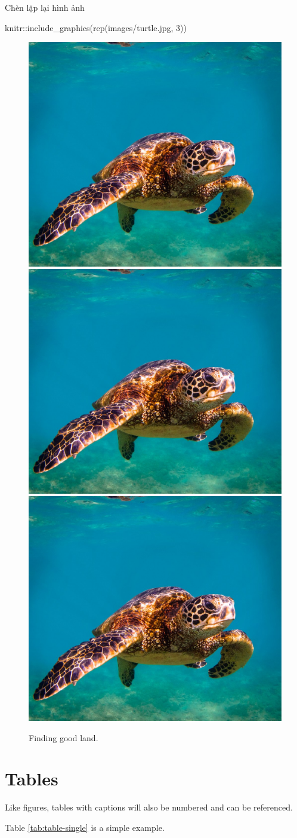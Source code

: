 \documentclass[
]{book}
\newenvironment{Shaded}{\begin{snugshade}}{\end{snugshade}}
\newcommand{\DecValTok}[1]{\textcolor[rgb]{0.00,0.00,0.81}{#1}}
\newcommand{\FunctionTok}[1]{\textcolor[rgb]{0.00,0.00,0.00}{#1}}
\newcommand{\NormalTok}[1]{#1}
\newcommand{\SpecialCharTok}[1]{\textcolor[rgb]{0.00,0.00,0.00}{#1}}
\newcommand{\StringTok}[1]{\textcolor[rgb]{0.31,0.60,0.02}{#1}}
\theoremstyle{definition}
\theoremstyle{definition}
\theoremstyle{definition}
\theoremstyle{definition}
\theoremstyle{remark}
\begin{document}
Chèn lặp lại hình ảnh

\begin{Shaded}
\begin{Highlighting}[]
\NormalTok{knitr}\SpecialCharTok{::}\FunctionTok{include\_graphics}\NormalTok{(}\FunctionTok{rep}\NormalTok{(}\StringTok{\textquotesingle{}images/turtle.jpg\textquotesingle{}}\NormalTok{, }\DecValTok{3}\NormalTok{))}
\end{Highlighting}
\end{Shaded}

\begin{figure}
\includegraphics[width=0.328\linewidth]{images/turtle} \includegraphics[width=0.328\linewidth]{images/turtle} \includegraphics[width=0.328\linewidth]{images/turtle} \caption{Finding good land.}\label{fig:turtle}
\end{figure}

\hypertarget{tables}{%
\section{Tables}\label{tables}}

Like figures, tables with captions will also be numbered and can be referenced.

Table \ref{tab:table-single} is a simple example.
\end{document}
